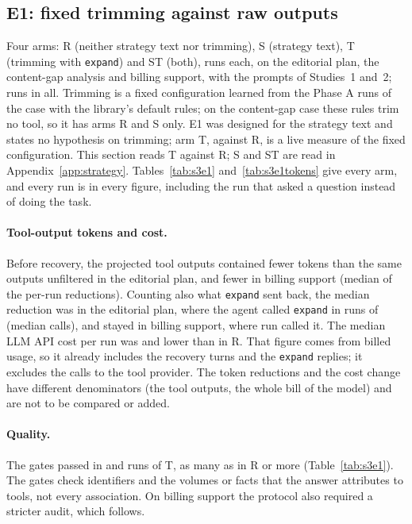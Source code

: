 \subsection{E1: fixed trimming against raw outputs}
\label{sec:s3e1}

Four arms: R (neither strategy text nor trimming), S (strategy text), T (trimming with \texttt{expand}) and ST
(both), \SthreeRunsPerArmEOne{} runs each, on the editorial plan, the content-gap analysis and billing support,
with the prompts of Studies~1 and~2; \SthreeRunsEOne{} runs in all. Trimming is a fixed configuration learned from
the \PhaseARunsi{} Phase A runs of the case with the library's default rules; on the content-gap case these rules
trim no tool, so it has arms R and S only. E1 was designed for the strategy text and states no hypothesis on
trimming; arm T, against R, is a live measure of the fixed configuration. This section reads T against R; S and ST
are read in Appendix~\ref{app:strategy}. Tables~\ref{tab:s3e1} and~\ref{tab:s3e1tokens} give every arm, and every
run is in every figure, including the run that asked a question instead of doing the task.

\paragraph{Tool-output tokens and cost.} Before recovery, the projected tool outputs contained
\SthreeEOneTrimBeforei{} fewer tokens than the same outputs unfiltered in the editorial plan, and
\SthreeEOneTrimBeforeiv{} fewer in billing support (median of the per-run reductions). Counting also what
\texttt{expand} sent back, the median reduction was \SthreeEOneTrimNeti{} in the editorial plan, where the agent
called \texttt{expand} in \SthreeEOneTrimExpandRunsi{} runs of \SthreeRunsPerArmEOne{} (median
\SthreeEOneTrimExpandi{} calls), and stayed \SthreeEOneTrimNetiv{} in billing support, where \SthreeEOneTrimExpandRunsiv{}
run called it. The median LLM API cost per run was \SthreeEOneTrimCosti{} and \SthreeEOneTrimCostiv{} lower than in R.
That figure comes from billed usage, so it already includes the recovery turns and the \texttt{expand} replies; it
excludes the calls to the tool provider. The token reductions and the cost change have different denominators (the
tool outputs, the whole bill of the model) and are not to be compared or added.

\paragraph{Quality.} The gates passed in \SthreeEOneTrimGatesi{} and \SthreeEOneTrimGatesiv{} runs of T, as many as in
R or more (Table~\ref{tab:s3e1}). The gates check identifiers and the volumes or facts that the answer attributes to
tools, not every association. On billing support the protocol also required a stricter audit, which follows.

